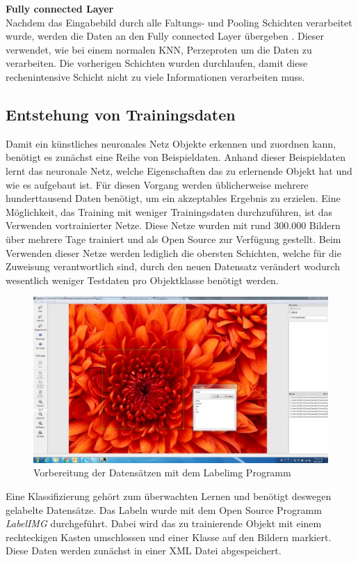 \textbf{Fully connected Layer}\\
Nachdem das Eingabebild durch alle Faltungs- und Pooling Schichten verarbeitet wurde, werden die Daten an den Fully connected Layer übergeben \cite[14]{sermanet2012convolutional}. Dieser verwendet, wie bei einem normalen KNN, Perzeproten um die Daten zu verarbeiten. Die vorherigen Schichten wurden durchlaufen, damit diese rechenintensive Schicht nicht zu viele Informationen verarbeiten muss. 
  \subsection{Entstehung von Trainingsdaten}\label{s.trainingsdaten} 
Damit ein künstliches neuronales Netz Objekte erkennen und zuordnen kann, benötigt es zunächst eine Reihe von Beispieldaten. Anhand dieser Beispieldaten lernt das neuronale Netz, welche Eigenschaften das zu erlernende Objekt hat und wie es aufgebaut ist. Für diesen Vorgang werden üblicherweise mehrere hunderttausend Daten benötigt, um ein akzeptables Ergebnis zu erzielen. Eine Möglichkeit, das Training mit weniger Trainingsdaten durchzuführen, ist das Verwenden vortrainierter Netze. Diese Netze wurden mit rund 300.000 Bildern über mehrere Tage trainiert und als Open Source zur Verfügung gestellt. Beim Verwenden dieser Netze werden lediglich die obersten Schichten, welche für die Zuweisung verantwortlich sind, durch den neuen Datensatz verändert wodurch wesentlich weniger Testdaten pro Objektklasse benötigt werden. 
\begin{figure}
	[h]
	\centering
	\includegraphics[scale=0.7]{Sources/labelimg.jpg}
	\caption{Vorbereitung der Datensätzen mit dem Labelimg Programm \cite{labelimg2019}}
	\label{img:labelimg}
\end{figure}
Eine Klassifizierung gehört zum überwachten Lernen und benötigt deswegen gelabelte Datensätze. Das Labeln wurde mit dem Open Source Programm \textit{LabelIMG} \cite{labelimg2019} durchgeführt. Dabei wird das zu trainierende Objekt mit einem rechteckigen Kasten umschlossen und einer Klasse auf den Bildern markiert. Diese Daten werden zunächst in einer XML Datei abgespeichert. 
